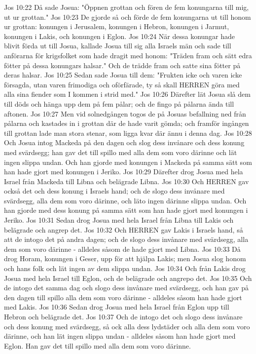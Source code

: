 Jos 10:22  Då sade Josua: "Öppnen grottan och fören de fem konungarna till mig, ut ur grottan."
Jos 10:23  De gjorde så och förde de fem konungarna ut till honom ur grottan: konungen i Jerusalem, konungen i Hebron, konungen i Jarmut, konungen i Lakis, och konungen i Eglon.
Jos 10:24  När dessa konungar hade blivit förda ut till Josua, kallade Josua till sig alla Israels män och sade till anförarna för krigsfolket som hade dragit med honom: "Träden fram och sätt edra fötter på dessa konungars halsar." Och de trädde fram och satte sina fötter på deras halsar.
Jos 10:25  Sedan sade Josua till dem: "Frukten icke och varen icke försagda, utan varen frimodiga och oförfärade, ty så skall HERREN göra med alla sina fiender som I kommen i strid med."
Jos 10:26  Därefter lät Josua slå dem till döds och hänga upp dem på fem pålar; och de fingo på pålarna ända till aftonen.
Jos 10:27  Men vid solnedgången togos de på Josuas befallning ned från pålarna och kastades in i grottan där de hade varit gömda; och framför ingången till grottan lade man stora stenar, som ligga kvar där ännu i denna dag.
Jos 10:28  Och Josua intog Mackeda på den dagen och slog dess invånare och dess konung med svärdsegg; han gav det till spillo med alla dem som voro därinne och lät ingen slippa undan. Och han gjorde med konungen i Mackeda på samma sätt som han hade gjort med konungen i Jeriko.
Jos 10:29  Därefter drog Josua med hela Israel från Mackeda till Libna och belägrade Libna.
Jos 10:30  Och HERREN gav också det och dess konung i Israels hand; och de slogo dess invånare med svärdsegg, alla dem som voro därinne, och läto ingen därinne slippa undan. Och han gjorde med dess konung på samma sätt som han hade gjort med konungen i Jeriko.
Jos 10:31  Sedan drog Josua med hela Israel från Libna till Lakis och belägrade och angrep det.
Jos 10:32  Och HERREN gav Lakis i Israels hand, så att de intogo det på andra dagen; och de slogo dess invånare med svärdsegg, alla dem som voro därinne - alldeles såsom de hade gjort med Libna.
Jos 10:33  Då drog Horam, konungen i Geser, upp för att hjälpa Lakis; men Josua slog honom och hans folk och lät ingen av dem slippa undan.
Jos 10:34  Och från Lakis drog Josua med hela Israel till Eglon, och de belägrade och angrepo det.
Jos 10:35  Och de intogo det samma dag och slogo dess invånare med svärdsegg, och han gav på den dagen till spillo alla dem som voro därinne - alldeles såsom han hade gjort med Lakis.
Jos 10:36  Sedan drog Josua med hela Israel från Eglon upp till Hebron och belägrade det.
Jos 10:37  Och de intogo det och slogo dess invånare och dess konung med svärdsegg, så ock alla dess lydstäder och alla dem som voro därinne, och han lät ingen slippa undan - alldeles såsom han hade gjort med Eglon. Han gav det till spillo med alla dem som voro därinne.
